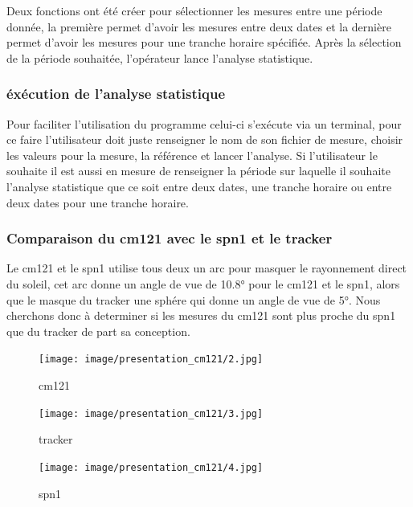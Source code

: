 \documentclass[12pt,a4paper]{article}
\begin{document}
\begin{flushleft}
Deux fonctions ont été créer pour sélectionner les mesures entre une période donnée, la première permet d'avoir les mesures entre deux dates et la dernière permet d'avoir les mesures pour une tranche horaire spécifiée. Après la sélection de la période souhaitée, l'opérateur lance l'analyse statistique.

\subsubsection{éxécution de l'analyse statistique}

Pour faciliter l'utilisation du programme celui-ci s'exécute via un terminal, pour ce faire l'utilisateur doit juste renseigner le nom de son fichier de mesure, choisir les valeurs pour la mesure, la référence et lancer l'analyse. Si l'utilisateur le souhaite il est aussi en mesure de renseigner la période sur laquelle il souhaite l'analyse statistique que ce soit entre deux dates, une tranche horaire ou entre deux dates pour une tranche horaire.


\subsubsection{Comparaison du cm121 avec le spn1 et le tracker}

Le cm121 et le spn1 utilise tous deux un arc pour masquer le rayonnement direct du soleil, cet arc donne un angle de vue de 10.8° pour le cm121 et le spn1, alors que le masque du tracker une sphére qui donne un angle de vue de 5°. Nous cherchons donc à determiner si les mesures du cm121 sont plus proche du spn1 que du tracker de part sa conception.

\begin{figure}[H]
    \begin{minipage}[c]{.2\linewidth}
        \centering
        \texttt{[image: image/presentation\_cm121/2.jpg]}  
        \caption{cm121}
    \end{minipage}
    \hfill%
    \begin{minipage}[c]{.2\linewidth}
        \centering
        \texttt{[image: image/presentation\_cm121/3.jpg]}  
        \caption{tracker}
    \end{minipage}
    \hfill%
    \begin{minipage}[c]{.3\linewidth}
        \centering
        \texttt{[image: image/presentation\_cm121/4.jpg]} 
        \caption{spn1}
    \end{minipage}
\end{figure}


\end{flushleft}
\end{document}
